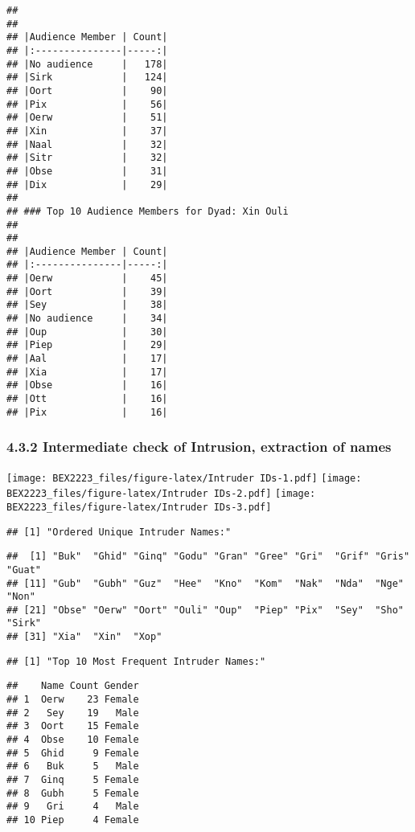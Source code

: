 \documentclass[
]{article}
\begin{document}
\begin{verbatim}
## 
## 
## |Audience Member | Count|
## |:---------------|-----:|
## |No audience     |   178|
## |Sirk            |   124|
## |Oort            |    90|
## |Pix             |    56|
## |Oerw            |    51|
## |Xin             |    37|
## |Naal            |    32|
## |Sitr            |    32|
## |Obse            |    31|
## |Dix             |    29|
## 
## ### Top 10 Audience Members for Dyad: Xin Ouli 
## 
## 
## |Audience Member | Count|
## |:---------------|-----:|
## |Oerw            |    45|
## |Oort            |    39|
## |Sey             |    38|
## |No audience     |    34|
## |Oup             |    30|
## |Piep            |    29|
## |Aal             |    17|
## |Xia             |    17|
## |Obse            |    16|
## |Ott             |    16|
## |Pix             |    16|
\end{verbatim}

\hypertarget{intermediate-check-of-intrusion-extraction-of-names}{%
\subsubsection{4.3.2 Intermediate check of Intrusion, extraction of
names}\label{intermediate-check-of-intrusion-extraction-of-names}}

\texttt{[image: BEX2223\_files/figure-latex/Intruder IDs-1.pdf]}
\texttt{[image: BEX2223\_files/figure-latex/Intruder IDs-2.pdf]}
\texttt{[image: BEX2223\_files/figure-latex/Intruder IDs-3.pdf]}

\begin{verbatim}
## [1] "Ordered Unique Intruder Names:"
\end{verbatim}

\begin{verbatim}
##  [1] "Buk"  "Ghid" "Ginq" "Godu" "Gran" "Gree" "Gri"  "Grif" "Gris" "Guat"
## [11] "Gub"  "Gubh" "Guz"  "Hee"  "Kno"  "Kom"  "Nak"  "Nda"  "Nge"  "Non" 
## [21] "Obse" "Oerw" "Oort" "Ouli" "Oup"  "Piep" "Pix"  "Sey"  "Sho"  "Sirk"
## [31] "Xia"  "Xin"  "Xop"
\end{verbatim}

\begin{verbatim}
## [1] "Top 10 Most Frequent Intruder Names:"
\end{verbatim}

\begin{verbatim}
##    Name Count Gender
## 1  Oerw    23 Female
## 2   Sey    19   Male
## 3  Oort    15 Female
## 4  Obse    10 Female
## 5  Ghid     9 Female
## 6   Buk     5   Male
## 7  Ginq     5 Female
## 8  Gubh     5 Female
## 9   Gri     4   Male
## 10 Piep     4 Female
\end{verbatim}
\end{document}
